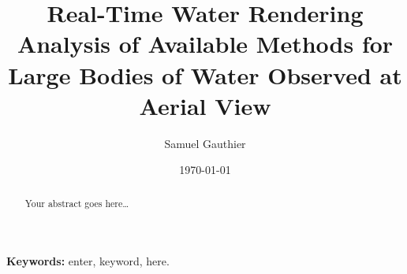 \title{\textbf{Real-Time Water Rendering}\\\Large{Analysis of Available
Methods for Large Bodies of Water Observed at Aerial View}}

\author{\normalsize{Samuel Gauthier}}
\date{\normalsize{\today}}
\maketitle

\begin{abstract}
Your abstract goes here\ldots\\
\end{abstract}

\small{{\bf Keywords:} enter, keyword, here.}
